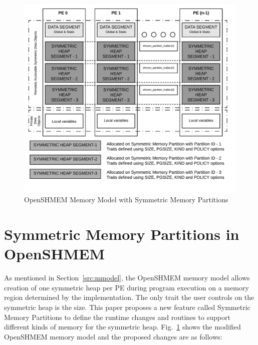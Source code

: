 \begin{figure}[!h]
    \vspace{-35pt}
    \hspace*{5mm}
    \includegraphics[scale=0.20]{image/smem-model.png}
    \vspace{-35pt}
    \caption{OpenSHMEM Memory Model with Symmetric Memory Partitions}
    \vspace{-25pt}
    \label{fig:smem-model}
\end{figure}

\section{Symmetric Memory Partitions in OpenSHMEM}
\label{src:smempart}

As mentioned in Section~\ref{src:mmodel}, the OpenSHMEM memory
model allows creation of one symmetric heap per PE during program
execution on a memory region determined by the implementation. The
only trait the user controls on the symmetric heap is the size.
This paper proposes a new feature called Symmetric Memory Partitions
to define the runtime changes and routines to support different
kinds of memory for the symmetric heap. Fig.~\ref{fig:smem-model}
shows the modified OpenSHMEM memory model and the proposed changes
are as follows:

